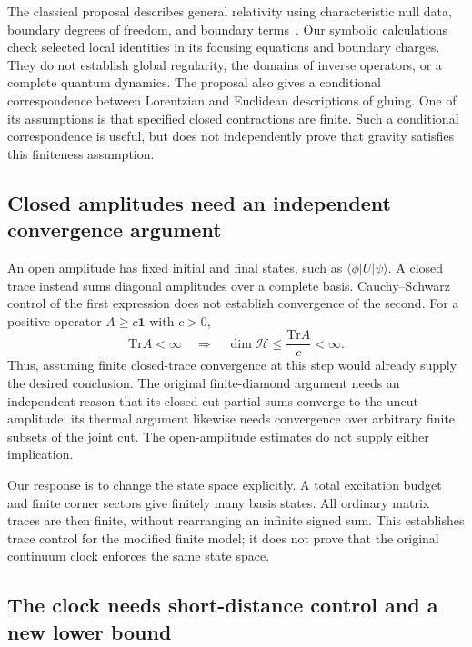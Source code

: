 \documentclass[onecolumn,11pt,aps,prd,amsmath,amssymb,nofootinbib,floatfix]{revtex4-2}
\newcommand{\calH}{\mathcal{H}}
\newcommand{\Tr}{\mathrm{Tr}}
\begin{document}
The classical proposal describes general relativity using characteristic null data, boundary degrees of freedom, and boundary terms~\cite{Chandrasekaran2026}. Our symbolic calculations check selected local identities in its focusing equations and boundary charges. They do not establish global regularity, the domains of inverse operators, or a complete quantum dynamics. The proposal also gives a conditional correspondence between Lorentzian and Euclidean descriptions of gluing. One of its assumptions is that specified closed contractions are finite. Such a conditional correspondence is useful, but does not independently prove that gravity satisfies this finiteness assumption.

\subsection{Closed amplitudes need an independent convergence argument}\label{sec:audit_fail}

An open amplitude has fixed initial and final states, such as $\langle\phi|U|\psi\rangle$. A closed trace instead sums diagonal amplitudes over a complete basis. Cauchy--Schwarz control of the first expression does not establish convergence of the second. For a positive operator $A\ge c\mathbf{1}$ with $c>0$,
\begin{equation}\label{eq:trace_gap}
\Tr A<\infty\quad\Longrightarrow\quad
\dim\calH\le \frac{\Tr A}{c}<\infty.
\end{equation}
Thus, assuming finite closed-trace convergence at this step would already supply the desired conclusion. The original finite-diamond argument needs an independent reason that its closed-cut partial sums converge to the uncut amplitude; its thermal argument likewise needs convergence over arbitrary finite subsets of the joint cut. The open-amplitude estimates do not supply either implication.

Our response is to change the state space explicitly. A total excitation budget and finite corner sectors give finitely many basis states. All ordinary matrix traces are then finite, without rearranging an infinite signed sum. This establishes trace control for the modified finite model; it does not prove that the original continuum clock enforces the same state space.

\subsection{The clock needs short-distance control and a new lower bound}\label{sec:audit_clock}
\end{document}
